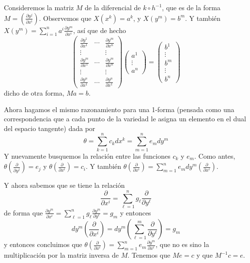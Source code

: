 \documentclass[spanish]{book}
\theoremstyle{definition}
\begin{document}
	Consideremos la matriz $M$ de la diferencial de $k\circ h^{-1}$, que es de la forma $M=\left(\frac{\partial y^j}{\partial x^i}\right)$. Observemos que $X(x^k)=a^k$, y $X(y^m)=b^m$. Y también $X(y^m)=\sum_{i=1}^na^i\frac{\partial y^m}{\partial x^i}$, así que de hecho
	\[\begin{pmatrix}
		\frac{\partial y^1}{\partial x^1}&\cdots&\frac{\partial y^m}{\partial x^n}\\
		\vdots&&\vdots\\
		\frac{\partial y^m}{\partial x^1}&\cdots&\frac{\partial y^m}{\partial x^n}\\
		\vdots&&\vdots\\
		\frac{\partial y^n}{\partial x^1}&\cdots&\frac{\partial y^n}{\partial x^1}
	\end{pmatrix}\begin{pmatrix}
		a^1\\\vdots\\a^n
	\end{pmatrix}=\begin{pmatrix}
		b^1\\\vdots\\ b^m\\\vdots\\b^n
	\end{pmatrix}\]
	dicho de otra forma, $Ma=b$.
	
	Ahora hagamos el mismo razonamiento para una 1-forma (pensada como una correspondencia que a cada punto de la variedad le asigna un elemento en el dual del espacio tangente) dada por
	\[\theta=\sum_{k=1}^nc_kdx^k=\sum_{m=1}^ne_mdy^m\]
	Y nuevamente busquemos la relación entre las funciones $c_k$ y $e_m$. Como antes, $\theta\left(\frac{\partial}{\partial y^j}\right)=e_j$ y $\theta\left(\frac{\partial}{\partial x^i}\right)=c_i$. Y también $\theta\left(\frac{\partial}{\partial x^i}\right)=\sum_{m=1}^ne_mdy^m\left(\frac{\partial}{\partial x^i}\right)$.
	
	Y ahora sabemos que se tiene la relación
	\[\frac{\partial}{\partial x^i}=\sum_{\ell=1}^ng_\ell\frac{\partial}{\partial y^\ell}\]
	de forma que $\frac{\partial y^m}{\partial x^i}=\sum_{\ell=1}^ng_\ell\frac{\partial y^m}{\partial y^\ell}=g_m$ y entonces
	\[dy^m\left(\frac{\partial}{\partial x^i}\right)=dy^m\left(\sum_{\ell=1}^m\frac{\partial}{\partial y^\ell}\right)=g_m\]
	y entonces concluimos que $\theta\left(\frac{\partial}{\partial x^i}\right)=\sum_{m=1}^ne_m\frac{\partial y^m}{\partial x^i}$, que no es sino la multiplicación por la matriz inversa de $M$. Tenemos que $Me=c$ y que $M^{-1}c=e$.
	
\end{document}

